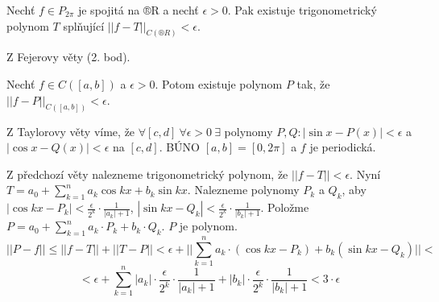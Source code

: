 \documentclass[12pt]{article}					%
\begin{document}

	\begin{veta}
		Nechť $f \in P_{2\pi}$ je spojitá na ®R a nechť $\epsilon > 0$. Pak existuje trigonometrický polynom $T$ splňující $||f - T||_{C(®R)} < \epsilon$.

		\begin{dukazin}
			Z Fejerovy věty (2. bod).
		\end{dukazin}
	\end{veta}

	\begin{dusledek}[Weierstrass]
		Nechť $f \in C([a, b])$ a $\epsilon > 0$. Potom existuje polynom $P$ tak, že $||f - P||_{C([a, b])} < \epsilon$.

		\begin{dukazin}
			Z Taylorovy věty víme, že $\forall [c, d]\ \forall \epsilon > 0\ \exists$ polynomy $P, Q: |\sin x - P(x)| < \epsilon$ a $|\cos x - Q(x)| < \epsilon$ na $[c, d]$. BÚNO $[a, b] = [0, 2\pi]$ a $f$ je periodická.

			Z předchozí věty nalezneme trigonometrický polynom, že $||f - T|| < \epsilon$. Nyní $T = a_0 + \sum_{k=1}^n a_k \cos kx + b_k \sin k x$. Nalezneme polynomy $P_k$ a $Q_k$, aby $|\cos k x - P_k| < \frac{\epsilon}{2^k}·\frac{1}{|a_k| + 1}$, $|\sin k x - Q_k| < \frac{\epsilon}{2^k}·\frac{1}{|b_k| + 1}$. Položme $P = a_0 + \sum_{k=1}^n a_k·P_k + b_k·Q_k$. $P$ je polynom.
			$$ ||P - f|| ≤ ||f - T|| + ||T - P|| < \epsilon + ||\sum_{k=1}^n a_k·(\cos k x - P_k) + b_k(\sin k x - Q_k)|| < $$
			$$ < \epsilon + \sum_{k=1}^n |a_k|·\frac{\epsilon}{2^k}·\frac{1}{|a_k| + 1} + |b_k|·\frac{\epsilon}{2^k}·\frac{1}{|b_k| + 1} < 3·\epsilon $$
		\end{dukazin}
	\end{dusledek}
\end{document}
